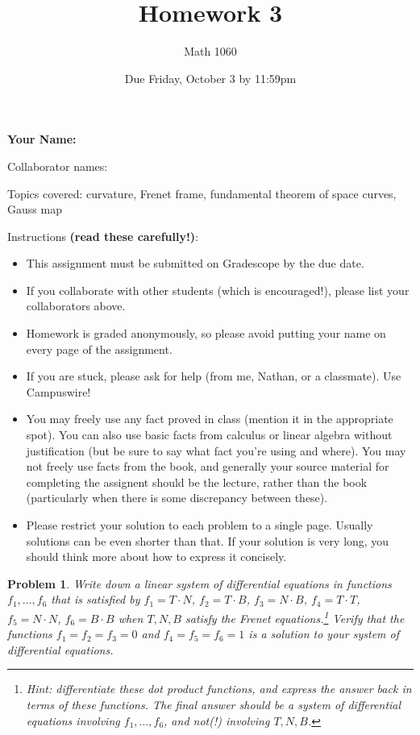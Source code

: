 \documentclass[11pt]{article}
\author{Math 1060}
\date{Due Friday, October 3 by 11:59pm}
\title{Homework 3}
\newtheorem{problem}{Problem}
\begin{document}
\maketitle


{\bf\Large Your Name:} 

Collaborator names: 


\vspace{.3in}
Topics covered: curvature, Frenet frame, fundamental theorem of space curves, Gauss map

Instructions {\bf (read these carefully!)}: 
\begin{itemize}
\item This assignment must be submitted on Gradescope by the due date. 
\item If you collaborate with other students (which is encouraged!), please list your collaborators above. 
\item Homework is graded anonymously, so please avoid putting your name on every page of the assignment.
\item If you are stuck, please ask for help (from me, Nathan, or a classmate). Use Campuswire!  
\item You may freely use any fact proved in class (mention it in the appropriate spot). You can also use basic facts from calculus or linear algebra without justification (but be sure to say what fact you're using and where). You may not freely use facts from the book, and generally your source material for completing the assignent should be the lecture, rather than the book (particularly when there is some discrepancy between these). 
\item Please restrict your solution to each problem to a single page. Usually solutions can be even shorter than that. If your solution is very long, you should think more about how to express it concisely.
\end{itemize}
\pagebreak 


\begin{problem}
Write down a linear system of differential equations in functions $f_1,\ldots,f_6$ that is satisfied by $f_1=T\cdot N$, $f_2=T\cdot B$, $f_3=N\cdot B$, $f_4=T\cdot T$, $f_5=N\cdot N$, $f_6=B\cdot B$ when $T,N,B$ satisfy the Frenet equations.\footnote{Hint: differentiate these dot product functions, and express the answer back in terms of these functions. The final answer should be a system of differential equations involving $f_1,\ldots,f_6$, and \emph{not(!)}  involving $T,N,B$.} Verify that the functions $f_1=f_2=f_3=0$ and $f_4=f_5=f_6=1$ is a solution to your system of differential equations.
\end{problem}
\end{document}
